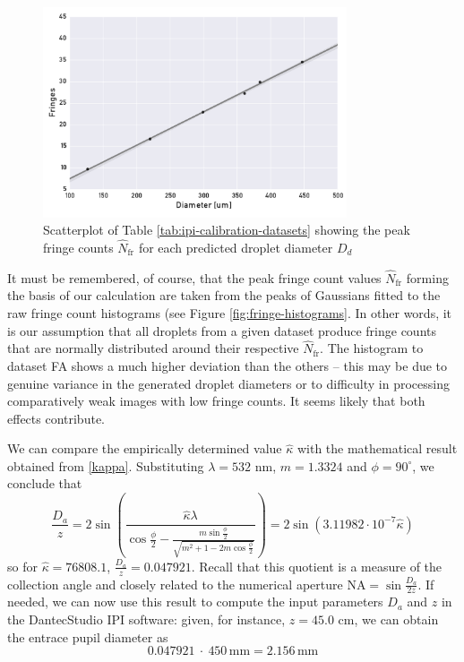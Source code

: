 \documentclass[11.5pt]{book}
\begin{document}
\begin{figure}[h!]
    \centering
    \includegraphics[width=0.8\textwidth]{img/fringe_regression.pdf}
    \caption{Scatterplot of Table \ref{tab:ipi-calibration-datasets} showing the peak fringe counts $\hat{N}_\text{fr}$ for each predicted droplet diameter $D_d$}
    \label{fig:fringe-regression}
\end{figure}
It must be remembered, of course, that the peak fringe count values
$\hat{N}_\text{fr}$ forming the basis of our calculation are taken from the
peaks of Gaussians fitted to the raw fringe count histograms (see Figure
\ref{fig:fringe-histograms}. In other words, it is our assumption that all
droplets from a given dataset produce fringe counts that are normally
distributed around their respective $\hat{N}_\text{fr}$. The histogram to
dataset FA shows a much higher deviation than the others -- this may be due to
genuine variance in the generated droplet diameters or to difficulty in
processing comparatively weak images with low fringe counts. It seems likely
that both effects contribute.

We can compare the empirically determined value $\hat{\kappa}$ with the
mathematical result obtained from \eqref{kappa}. Substituting $\lambda = 532$
nm, $m = 1.3324$ and $\phi = 90^\circ$, we conclude that
\begin{equation}
    \frac{D_a}{z} = 2 \sin \left( \frac{\hat{\kappa} \lambda}{\cos
    \frac{\phi}{2} - \frac{ m \sin \frac{\phi}{2}}{\sqrt{m^2 + 1 - 2m \cos
    \frac{\phi}{2}}}} \right) = 2\sin (3.11982 \cdot 10^{-7} \hat{\kappa})
\end{equation}
so for $\hat{\kappa} = 76808.1$, $\frac{D_a}{z} = 0.047921$. Recall that this
quotient is a measure of the collection angle and closely related to the
numerical aperture NA$=\sin \frac{D_a}{2z}$. If needed, we can now use this
result to compute the input parameters $D_a$ and $z$ in the DantecStudio IPI
software: given, for instance, $z = 45.0$ cm, we can obtain the entrace pupil
diameter as
\begin{equation}
    0.047921~\cdot~450\,\mathrm{mm} = 2.156\,\mathrm{mm}
\end{equation}
\end{document}
